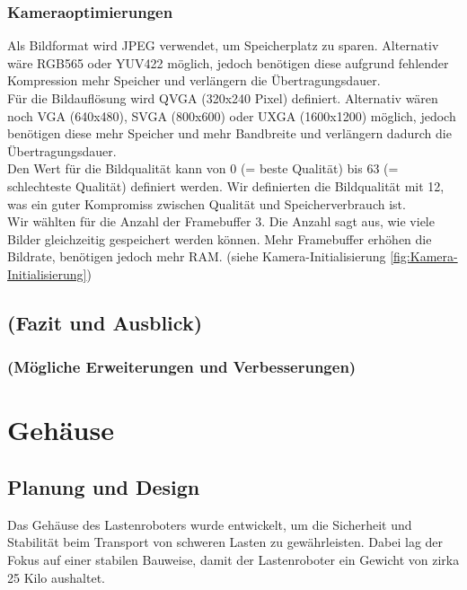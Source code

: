 \documentclass[ngerman,12pt,a4paper]{article}
\begin{document}
							\subsubsection*{Kameraoptimierungen}
	Als Bildformat wird JPEG verwendet, um Speicherplatz zu sparen. Alternativ wäre RGB565 oder YUV422 möglich, jedoch benötigen diese aufgrund fehlender Kompression mehr Speicher und verlängern die Übertragungsdauer. \\[0.5cm]
	Für die Bildauflösung wird QVGA (320x240 Pixel) definiert. Alternativ wären noch VGA (640x480), SVGA (800x600) oder UXGA (1600x1200) möglich, jedoch benötigen diese mehr Speicher und mehr Bandbreite und verlängern dadurch die Übertragungsdauer.\\[0.5cm]
	Den Wert für die Bildqualität kann von 0 (= beste Qualität) bis 63 (= schlechteste Qualität) definiert werden. Wir definierten die Bildqualität mit 12, was ein guter Kompromiss zwischen Qualität und Speicherverbrauch ist.\\[0.5cm]
	Wir wählten für die Anzahl der Framebuffer 3. Die Anzahl sagt aus, wie viele Bilder gleichzeitig gespeichert werden können. Mehr Framebuffer erhöhen die Bildrate, benötigen jedoch mehr RAM. (siehe Kamera-Initialisierung \ref{fig:Kamera-Initialisierung})\\[0.5cm]
					
		\subsection{(Fazit und Ausblick)}
		
			\subsubsection{(Mögliche Erweiterungen und Verbesserungen)}
	\newpage
	\section{Gehäuse}
	
		\subsection{Planung und Design} %
		
		Das Gehäuse des Lastenroboters wurde entwickelt, um die Sicherheit und Stabilität beim Transport von schweren Lasten zu gewährleisten. Dabei lag der Fokus auf einer stabilen Bauweise, damit der Lastenroboter ein Gewicht von zirka 25 Kilo aushaltet. 
		
\end{document}
